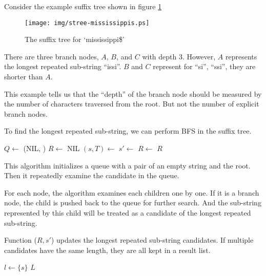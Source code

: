 \documentclass[UTF8]{article}
\begin{document}
Consider the example suffix tree shown in figure \ref{fig:stree-mississippis}

\begin{figure}[htbp]
  \centering
  \texttt{[image: img/stree-mississippis.ps]}
  \caption{The suffix tree for `mississippi\$'} \label{fig:stree-mississippis}
\end{figure}

There are three branch nodes, $A$, $B$, and $C$ with depth 3. However, $A$ represents
the longest repeated sub-string ``issi''. $B$ and $C$ represent for ``si'', ``ssi'',
they are shorter than $A$.

This example tells us that the ``depth'' of the branch node should be measured
by the number of characters traversed from the root. But not the number of
explicit branch nodes.

To find the longest repeated sub-string, we can perform BFS in the suffix tree.

\begin{algorithmic}[1]
  \State $Q \gets$ (NIL, )
  \State $R \gets$ NIL
    \State $(s, T) \gets$ 
        \State $s' \gets$ 
        \State {}
        \State $R \gets$ 
      \EndIf
    \EndFor
  \EndWhile
  \State \Return $R$
\EndFunction
\end{algorithmic}

This algorithm initializes a queue with a pair of an
empty string and the root. Then it repeatedly examine the candidate in the queue.

For each node, the algorithm examines each children one by one.
If it is a branch node, the child is pushed back
to the queue for further search. And the sub-string represented
by this child will be treated as a candidate of the
longest repeated sub-string.

Function ($R, s'$) updates the longest repeated
sub-string candidates. If multiple candidates have the same length, they
are all kept in a result list.

\begin{algorithmic}[1]
    \State \Return $l \gets \{ s \}$
  \EndIf
    \State \Return {}
  \EndIf
  \State \Return $L$
\EndFunction
\end{algorithmic}
\end{document}
